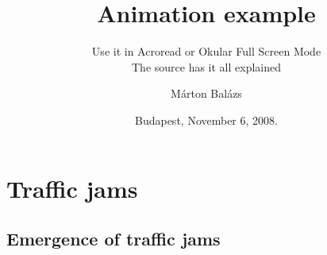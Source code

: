 \documentclass[compress,xcolor=dvipsnames]{beamer}
\title{Animation example}
\author{M\'arton Bal\'azs}
\subtitle{{\small Use it in Acroread or Okular Full Screen Mode}\\
{\small The source has it all explained}}
\date{Budapest, November 6, 2008.}
\institute{BUTE}
\newcounter{ab}
\newcounter{af}
\newcounter{ag}
\begin{document}
\frame{\titlepage}

\frame{\tableofcontents}

\section[Jams]{Traffic jams}

\subsection[Emerging]{Emergence of traffic jams}
\end{document}
